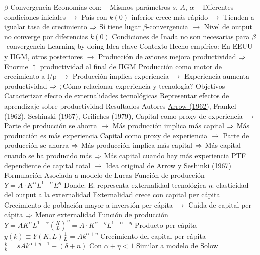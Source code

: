 \documentclass{nuevotema}
\begin{document}
\begin{esquemal}
				\4 $\beta$-Convergencia
				\4[] Economías con:
				\4[] -- Mismos parámetros $s$, $A$, $\alpha$
				\4[] -- Diferentes condiciones iniciales
				\4[] $\to$ País con $k(0)$ inferior crece más rápido
				\4[] $\to$ Tienden a igualar tasa de crecimiento
				\4[] $\Rightarrow$ Sí tiene lugar $\beta$-convergencia
				\4[] $\to$ Nivel de output no converge por diferencias $k(0)$
				\4[] Condiciones de Inada no son necesarias para $\beta$-convergencia
		\2 Learning by doing
			\3 Idea clave
				\4 Contexto
				\4[] Hecho empírico:
				\4[] En EEUU y IIGM, otros posteriores
				\4[] $\to$ Producción de aviones mejora productividad
				\4[] $\Rightarrow$ Enorme $\uparrow$ productividad al final de IIGM
				\4[] Producción como motor de crecimiento a l/p
				\4[] $\to$ Producción implica experiencia
				\4[] $\to$ Experiencia aumenta productividad
				\4[] $\Rightarrow$ ¿Cómo relacionar experiencia y tecnología?
				\4 Objetivos
				\4[] Caracterizar efecto de externalidades tecnológicas
				\4[] Representar efectos de aprendizaje sobre productividad
				\4 Resultados
				\4[] Autores
				\4[] \underline{Arrow (1962)},
				\4[] Frankel (1962), Seshinski (1967), Griliches (1979),
				\4[] Capital como proxy de experiencia
				\4[] $\to$ Parte de producción se ahorra
				\4[] $\to$ Más producción implica más capital
				\4[] $\Rightarrow$ Más producción es más experiencia
				\4[] Capital como proxy de experiencia
				\4[] $\to$ Parte de producción se ahorra
				\4[] $\Rightarrow$ Más producción implica más capital
				\4[] $\Rightarrow$ Más capital cuando se ha producido más
				\4[] $\Rightarrow$ Más capital cuando hay más experiencia
				\4[] PTF dependiente de capital total
				\4[] $\to$ Idea original de Arrow y Seshinki (1967)
			\3 Formulación
				\4 Asociada a modelo de Lucas
				\4 Función de producción
				\4[] $Y=A \cdot K^\alpha L^{1-\alpha} E^\eta$
				\4 Donde:
				\4[] E: representa externalidad tecnológica
				\4[] $\eta$: elasticidad del output a la externalidad
				\4 Externalidad crece con capital per cápita
				\4[] Crecimiento de población mayor a inversión per cápita
				\4[] $\to$ Caída de capital per cápita
				\4[] $\Rightarrow$ Menor externalidad
				\4[] 
				\4 Función de producción
				\4[] $Y=A K^\alpha L^{1-\alpha} \left( \frac{K}{L} \right)^\eta = A \cdot K^{\alpha + \eta} L^{1-\alpha - \eta}$
				\4 Producto per cápita
				\4[] $y (k) \equiv Y(K,L) \frac{1}{L} = A k^{\alpha+\eta}$
				\4 Crecimiento del capital per cápita
				\4[] $\frac{\dot{k}}{k} = sAk^{\alpha+\eta-1} - (\delta+n)$
				\4 Con $\alpha + \eta < 1$
				\4[] Similar a modelo de Solow

\end{esquemal}
\end{document}
